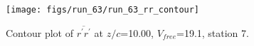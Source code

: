 \begin{figure}[H]
\centering
\texttt{[image: figs/run\_63/run\_63\_rr\_contour]}
\caption{Contour plot of $\overline{r^\prime r^\prime}$ at $z/c$=10.00, $V_{free}$=19.1, station 7.}
\end{figure}


